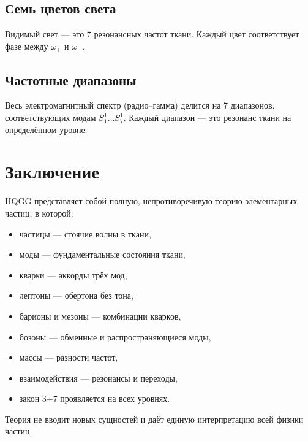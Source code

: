 \documentclass[12pt,a4paper]{article}
\begin{document}
\subsection{Семь цветов света}

Видимый свет — это 7 резонансных частот ткани. Каждый цвет соответствует фазе между \(\omega_{+}\) и \(\omega_{-}\).

\subsection{Частотные диапазоны}

Весь электромагнитный спектр (радио–гамма) делится на 7 диапазонов, соответствующих модам \(S^1_1 \dots S^1_7\). Каждый диапазон — это резонанс ткани на определённом уровне.

\section{Заключение}

HQGG представляет собой полную, непротиворечивую теорию элементарных частиц, в которой:

\begin{itemize}
\item частицы — стоячие волны в ткани,
\item моды — фундаментальные состояния ткани,
\item кварки — аккорды трёх мод,
\item лептоны — обертона без тона,
\item барионы и мезоны — комбинации кварков,
\item бозоны — обменные и распространяющиеся моды,
\item массы — разности частот,
\item взаимодействия — резонансы и переходы,
\item закон 3+7 проявляется на всех уровнях.
\end{itemize}

Теория не вводит новых сущностей и даёт единую интерпретацию всей физики частиц.

\begin{center}
\end{center}
\end{document}

